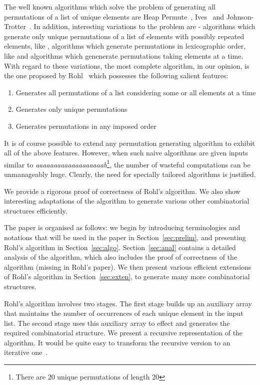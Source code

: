 \documentclass{article}
\begin{document}
The well known algorithms which solve the problem of generating all  permutations of a list of  unique elements are Heap Permute~\cite{heap_permute}, Ives~\cite{ives_perm} and Johnson-Trotter~\cite{trotter_perm}. In addition, interesting variations to the problem are - algorithms which generate only unique permutations of a list of elements with possibly repeated elements, like \cite{bratley_unique, chase_unique, sag_repetitions}, algorithms which generate permutations in lexicographic order, like \cite{smith_lexico1, schrack_lexico, shen_lexico} and algorithms which genenerate permutations taking  elements at a time. With regard to these variations, the most complete algorithm, in our opinion, is the one proposed by Rohl~\cite{rohl1} which possesses the following salient features:
\begin{enumerate}
\item Generates all permutations of a list considering some or all elements at a time
\item Generates only unique permutations
\item Generates permutations in any imposed order
\end{enumerate}
It is of course possible to extend any permutation generating algorithm to exhibit all of the above features. However, when such naive algorithms are given inputs similar to \emph{aaaaaaaaaaaaaaaaaaab}\footnote{There are 20 unique permutations of length 20}, the number of wasteful computations can be unmanageably huge. Clearly, the need for specially tailored algorithms is justified.

We provide a rigorous proof of correctness of Rohl's algorithm. We also show interesting adaptations of the algorithm to generate various other combinatorial structures efficiently.

The paper is organised as follows: we begin by introducing terminologies and notations that will be used in the paper in Section~\ref{sec:prelim}, and presenting Rohl's algorithm in Section~\ref{sec:algo}. Section~\ref{sec:anal} contains a detailed analysis of the algorithm, which also includes the proof of correctness of the algorithm (missing in Rohl's paper). We then present various efficient extensions of Rohl's algorithm in Section~\ref{sec:exten}, to generate many more combinatorial structures.

Rohl's algorithm involves two stages. The first stage builds up an auxiliary array that maintains the number of occurrences of each unique element in the input list. The second stage uses this auxiliary array to effect and generates the required combinatorial structure. We present a recursive representation of the algorithm. It would be quite easy to transform the recursive version to an iterative one~\cite{rec2iter}.
\end{document}

